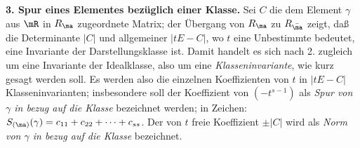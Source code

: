 \textbf{3. Spur eines Elementes bezüglich einer Klasse.} Sei $C$ die dem Element $\gamma$ aus $\mR$ in $R_\ma$ zugeordnete Matrix; der Übergang von $R_\ma$ zu $R_{\bar\ma}$ zeigt, daß die Determinante $|C|$ und allgemeiner $|tE-C|$, wo $t$ eine Unbestimmte bedeutet, eine Invariante der Darstellungsklasse ist. Damit handelt es sich nach 2. zugleich um eine Invariante der Idealklasse, also um eine \emph{Klasseninvariante}, wie kurz gesagt werden soll. Es werden also die einzelnen Koeffizienten von $t$ in $|tE-C|$ Klasseninvarianten; insbesondere soll der Koeffizient von $(-t^{s-1})$ als \emph{Spur von $\gamma$ in bezug auf die Klasse} bezeichnet werden; in Zeichen: $S_{(\ma)}(\gamma)=c_{11}+c_{22}+\cdots+c_{ss}$. Der von $t$ freie Koeffizient $\pm|C|$ wird als \emph{Norm von $\gamma$ in bezug auf die Klasse} bezeichnet.